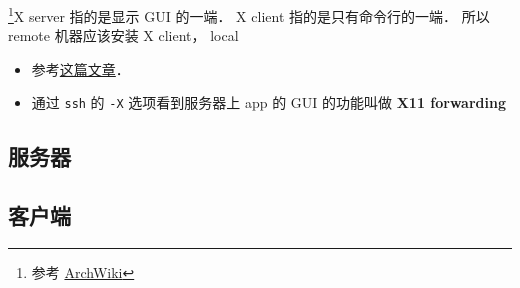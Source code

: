 
\begin{issues}
\issueDraft
\end{issues}

\footnote{参考 \href{https://wiki.archlinux.org/title/xorg}{ArchWiki}}X server 指的是显示 GUI 的一端． X client 指的是只有命令行的一端． 所以 remote 机器应该安装 X client， local

\begin{itemize}
\item 参考\href{https://ostechnix.com/how-to-configure-x11-forwarding-using-ssh-in-linux/}{这篇文章}．
\item 通过 \verb|ssh| 的 \verb|-X| 选项看到服务器上 app 的 GUI 的功能叫做 \textbf{X11 forwarding}
\end{itemize}


\subsection{服务器}

\subsection{客户端}
